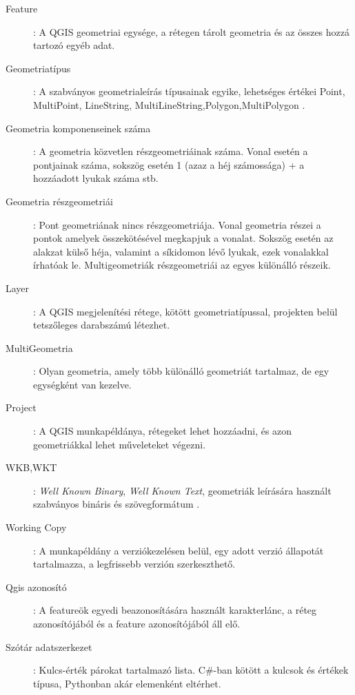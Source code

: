 \begin{description}
	\item[Feature]: A QGIS geometriai egysége, a rétegen tárolt geometria és az összes hozzá tartozó egyéb adat.

	\item[Geometriatípus]: A szabványos geometrialeírás típusainak egyike, lehetséges értékei Point, MultiPoint, LineString, MultiLineString,Polygon,MultiPolygon .

	\item[Geometria komponenseinek száma]: A geometria közvetlen részgeometriáinak száma. Vonal esetén a pontjainak száma, sokszög esetén 1 (azaz a héj számossága) + a hozzáadott lyukak száma stb.

	\item[Geometria részgeometriái]: Pont geometriának nincs részgeometriája. Vonal geometria részei a pontok amelyek összekötésével megkapjuk a vonalat. Sokszög esetén az alakzat külső héja, valamint a síkidomon lévő lyukak, ezek vonalakkal írhatóak le. Multigeometriák részgeometriái az egyes különálló részeik.

	\item[Layer]: A QGIS megjelenítési rétege, kötött geometriatípussal, projekten belül tetszőleges darabszámú létezhet.

	\item[MultiGeometria]: Olyan geometria, amely több különálló geometriát tartalmaz, de egy egységként van kezelve.

	\item[Project]: A QGIS munkapéldánya, rétegeket lehet hozzáadni, és azon geometriákkal lehet műveleteket végezni.

	\item[WKB,WKT]: \emph{Well Known Binary}, \emph{Well Known Text}, geometriák leírására használt szabványos bináris és szövegformátum \cite{sfa}.

	\item[Working Copy]: A munkapéldány a verziókezelésen belül, egy adott verzió állapotát tartalmazza, a legfrissebb verzión szerkeszthető.

	\item[Qgis azonosító]: A featureök egyedi beazonosítására használt karakterlánc, a réteg azonosítójából és a feature azonosítójából áll elő.

	\item[Szótár adatszerkezet]: Kulcs-érték párokat tartalmazó lista. C\#-ban kötött a kulcsok és értékek típusa, Pythonban akár elemenként eltérhet.
\end{description}